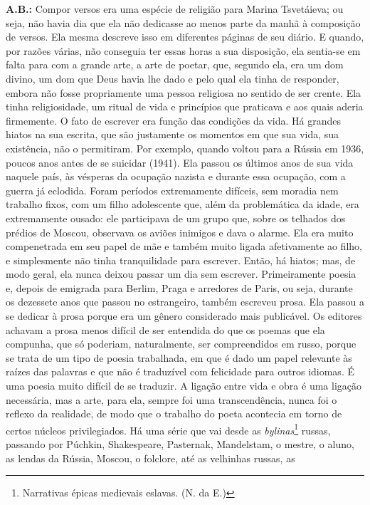 \textbf{A.B.:} Compor versos era uma espécie de religião para Marina
Tsvetáieva; ou seja, não havia dia que ela não dedicasse ao menos parte
da manhã à composição de versos. Ela mesma descreve isso em diferentes
páginas de seu diário. E quando, por razões várias, não conseguia ter
essas horas a sua disposição, ela sentia-se em falta para com a grande
arte, a arte de poetar, que, segundo ela, era um dom divino, um dom que
Deus havia lhe dado e pelo qual ela tinha de responder, embora não fosse
propriamente uma pessoa religiosa no sentido de ser crente. Ela tinha
religiosidade, um ritual de vida e princípios que praticava e aos quais
aderia firmemente. O fato de escrever era função das condições da vida.
Há grandes hiatos na sua escrita, que são justamente os momentos em que
sua vida, sua existência, não o permitiram. Por exemplo, quando voltou
para a Rússia em 1936, poucos anos antes de se suicidar (1941). Ela
passou os últimos anos de sua vida naquele país, às vésperas da ocupação
nazista e durante essa ocupação, com a guerra já eclodida. Foram
períodos extremamente difíceis, sem moradia nem trabalho fixos, com um
filho adolescente que, além da problemática da idade, era extremamente
ousado: ele participava de um grupo que, sobre os telhados dos prédios
de Moscou, observava os aviões inimigos e dava o alarme. Ela era muito
compenetrada em seu papel de mãe e também muito ligada afetivamente ao
filho, e simplesmente não tinha tranquilidade para escrever. Então, há
hiatos; mas, de modo geral, ela nunca deixou passar um dia sem escrever.
Primeiramente poesia e, depois de emigrada para Berlim, Praga e
arredores de Paris, ou seja, durante os dezessete anos que passou no
estrangeiro, também escreveu prosa. Ela passou a se dedicar à prosa
porque era um gênero considerado mais publicável. Os editores achavam a
prosa menos difícil de ser entendida do que os poemas que ela compunha,
que só poderiam, naturalmente, ser compreendidos em russo, porque se
trata de um tipo de poesia trabalhada, em que é dado um papel relevante
às raízes das palavras e que não é traduzível com felicidade para outros
idiomas. É uma poesia muito difícil de se traduzir. A ligação entre vida
e obra é uma ligação necessária, mas a arte, para ela, sempre foi uma
transcendência, nunca foi o reflexo da realidade, de modo que o trabalho
do poeta acontecia em torno de certos núcleos privilegiados. Há uma
série que vai desde as \emph{bylinas}\footnote{Narrativas épicas
  medievais eslavas. (N. da E.)} russas, passando por Púchkin,
Shakespeare, Pasternak, Mandelstam, o mestre, o aluno, as lendas da
Rússia, Moscou, o folclore, até as velhinhas russas, as
